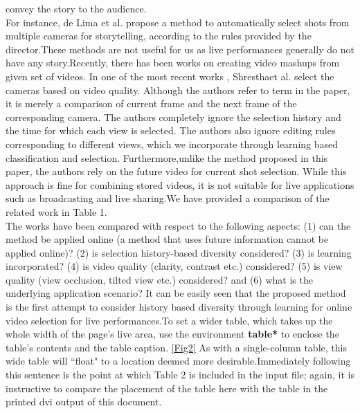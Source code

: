 \documentclass{sig-alternate}
\begin{document}
convey the story to the audience.\\
For instance, de Lima et al. \cite{web:9}propose a method to automatically select shots from multiple cameras for storytelling, according to the rules provided by the director.These methods are not useful for us as live performances generally
do not have any story.Recently, there has been works on creating video mashups from given set of videos. In one of the most recent works \cite{web:15}, Shresthaet al. select the cameras based on video quality. Although the authors refer to term  in the paper, it is merely a comparison of current frame and the next frame of the corresponding camera. The authors completely ignore the selection history and the time for which each view is selected. The authors also ignore editing rules corresponding to different views, which we incorporate
through learning based classification and selection. Furthermore,unlike the method proposed in this paper, the authors rely on the future video for current shot selection. While this approach is fine for combining stored videos, it is not suitable for live applications
such as broadcasting and live sharing.We have provided a comparison of the related work in Table 1.\\
The works have been compared with respect to the following aspects: (1) can the method be applied online (a method that uses \cite{web:4}future information cannot be applied online)? (2) is selection history-based diversity considered? (3) is learning incorporated? (4) is video quality (clarity, contrast etc.) considered? (5) is view quality (view occlusion, tilted view etc.) considered? and (6) what is the underlying application scenario? It can be easily seen that the proposed method is the first attempt to consider history based diversity through learning for online video selection for live performances.To set a wider table, which takes up the whole width of the page's live area, use the environment \textbf{table*} to enclose the table's contents and the table caption. \ref{Fig2} As with a single-column table, this wide table will ``float" to a location deemed more desirable.Immediately following this sentence is the point at which Table 2 is included in the input file; again, it is instructive to compare the placement of the table here with the table in the printed dvi output of this document.
\end{document}
